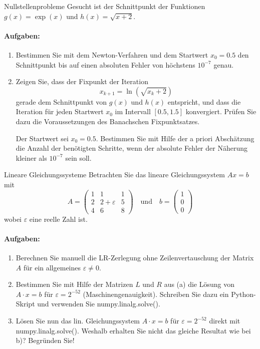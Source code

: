 \begin{example2}{Nullstellenprobleme}
Gesucht ist der Schnittpunkt der Funktionen $g(x) = \exp(x)$ und $h(x) = \sqrt{x+2}$.

\paragraph{Aufgaben:}
\begin{enumerate}
    \item Bestimmen Sie mit dem Newton-Verfahren und dem Startwert $x_0 = 0.5$ den Schnittpunkt bis auf einen absoluten Fehler von höchstens $10^{-7}$ genau.
    
    \item Zeigen Sie, dass der Fixpunkt der Iteration
    $$x_{k+1} = \ln(\sqrt{x_k + 2})$$
    gerade dem Schnittpunkt von $g(x)$ und $h(x)$ entspricht, und dass die Iteration für jeden Startwert $x_0$ im Intervall $[0.5, 1.5]$ konvergiert. Prüfen Sie dazu die Voraussetzungen des Banachschen Fixpunktsatzes.
    
    Der Startwert sei $x_0 = 0.5$. Bestimmen Sie mit Hilfe der a priori Abschätzung die Anzahl der benötigten Schritte, wenn der absolute Fehler der Näherung kleiner als $10^{-7}$ sein soll.
\end{enumerate}
\end{example2}

\begin{example2}{Lineare Gleichungssysteme}
Betrachten Sie das lineare Gleichungssystem $Ax = b$ mit
$$A = \begin{pmatrix}
1 & 1 & 1\\
2 & 2+\varepsilon & 5\\
4 & 6 & 8
\end{pmatrix}
\quad \text{und} \quad
b = \begin{pmatrix}
1\\
0\\
0
\end{pmatrix}$$
wobei $\varepsilon$ eine reelle Zahl ist.

\paragraph{Aufgaben:}
\begin{enumerate}
    \item Berechnen Sie manuell die LR-Zerlegung ohne Zeilenvertauschung der Matrix $A$ für ein allgemeines $\varepsilon \neq 0$.
    
    \item Bestimmen Sie mit Hilfe der Matrizen $L$ und $R$ aus (a) die Lösung von $A \cdot x = b$ für $\varepsilon = 2^{-52}$ (Maschinengenauigkeit). Schreiben Sie dazu ein Python-Skript und verwenden Sie numpy.linalg.solve().
    
    \item Lösen Sie nun das lin. Gleichungssystem $A \cdot x = b$ für $\varepsilon = 2^{-52}$ direkt mit numpy.linalg.solve(). Weshalb erhalten Sie nicht das gleiche Resultat wie bei b)? Begründen Sie!
\end{enumerate}
\end{example2}

